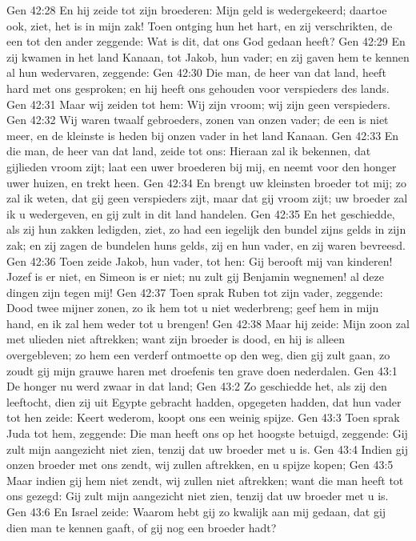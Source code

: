 Gen 42:28  En hij zeide tot zijn broederen: Mijn geld is wedergekeerd; daartoe ook, ziet, het is in mijn zak! Toen ontging hun het hart, en zij verschrikten, de een tot den ander zeggende: Wat is dit, dat ons God gedaan heeft?
Gen 42:29  En zij kwamen in het land Kanaan, tot Jakob, hun vader; en zij gaven hem te kennen al hun wedervaren, zeggende:
Gen 42:30  Die man, de heer van dat land, heeft hard met ons gesproken; en hij heeft ons gehouden voor verspieders des lands.
Gen 42:31  Maar wij zeiden tot hem: Wij zijn vroom; wij zijn geen verspieders.
Gen 42:32  Wij waren twaalf gebroeders, zonen van onzen vader; de een is niet meer, en de kleinste is heden bij onzen vader in het land Kanaan.
Gen 42:33  En die man, de heer van dat land, zeide tot ons: Hieraan zal ik bekennen, dat gijlieden vroom zijt; laat een uwer broederen bij mij, en neemt voor den honger uwer huizen, en trekt heen.
Gen 42:34  En brengt uw kleinsten broeder tot mij; zo zal ik weten, dat gij geen verspieders zijt, maar dat gij vroom zijt; uw broeder zal ik u wedergeven, en gij zult in dit land handelen.
Gen 42:35  En het geschiedde, als zij hun zakken ledigden, ziet, zo had een iegelijk den bundel zijns gelds in zijn zak; en zij zagen de bundelen huns gelds, zij en hun vader, en zij waren bevreesd.
Gen 42:36  Toen zeide Jakob, hun vader, tot hen: Gij berooft mij van kinderen! Jozef is er niet, en Simeon is er niet; nu zult gij Benjamin wegnemen! al deze dingen zijn tegen mij!
Gen 42:37  Toen sprak Ruben tot zijn vader, zeggende: Dood twee mijner zonen, zo ik hem tot u niet wederbreng; geef hem in mijn hand, en ik zal hem weder tot u brengen!
Gen 42:38  Maar hij zeide: Mijn zoon zal met ulieden niet aftrekken; want zijn broeder is dood, en hij is alleen overgebleven; zo hem een verderf ontmoette op den weg, dien gij zult gaan, zo zoudt gij mijn grauwe haren met droefenis ten grave doen nederdalen.
Gen 43:1  De honger nu werd zwaar in dat land;
Gen 43:2  Zo geschiedde het, als zij den leeftocht, dien zij uit Egypte gebracht hadden, opgegeten hadden, dat hun vader tot hen zeide: Keert wederom, koopt ons een weinig spijze.
Gen 43:3  Toen sprak Juda tot hem, zeggende: Die man heeft ons op het hoogste betuigd, zeggende: Gij zult mijn aangezicht niet zien, tenzij dat uw broeder met u is.
Gen 43:4  Indien gij onzen broeder met ons zendt, wij zullen aftrekken, en u spijze kopen;
Gen 43:5  Maar indien gij hem niet zendt, wij zullen niet aftrekken; want die man heeft tot ons gezegd: Gij zult mijn aangezicht niet zien, tenzij dat uw broeder met u is.
Gen 43:6  En Israel zeide: Waarom hebt gij zo kwalijk aan mij gedaan, dat gij dien man te kennen gaaft, of gij nog een broeder hadt?
